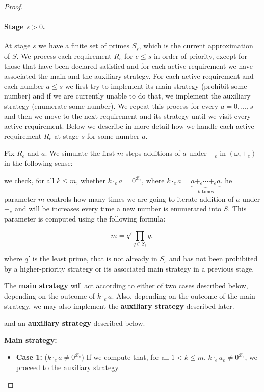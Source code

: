 \documentclass{pracalicmgr2025}
\theoremstyle{plain}            %
\theoremstyle{remark}           %
\theoremstyle{definition}       %
\begin{document}
\begin{proof}
\paragraph{Stage $s > 0$.}
At stage $s$ we have a finite set of primes $S_s$, which is the current approximation of $S$. We process each requirement $R_e$ for $e \le s$ in order of priority, except for those that have been declared satisfied and for each active requirement we have associated the main and the auxiliary strategy. For each active requirement and each number $a \le s$ we first try to implement its main strategy (prohibit some number) and if we are currently unable to do that, we implement the auxiliary strategy (enumerate some number). We repeat this process for every $a=0,...,s$ and then we move to the next requirement and its strategy until we visit every active requirement. Below we describe in more detail how we handle each active requirement $R_e$ at stage $s$ for some number $a$.


  
Fix $R_e$ and $a$. We simulate the first $m$ steps additions of $a$ under $+_e$ in $(\omega, +_e)$ in the following sense: 

we check, for all $k \le m$, whether $k \cdot_e a = 0^{\mathcal{B}_e}$, where $k \cdot_e a = \underbrace{a +_e \cdots +_e a}_{k \text{ times}}$. he parameter $m$ controls how many times we are going to iterate addition of $a$ under $+_e$ and will be increases every time a new number is enumerated into $S$. This parameter is computed using the following formula:

$$m = q' \prod_{q \in S_s} q,$$

where $q'$ is the least prime, that is not already in $S_s$ and has not been prohibited by a higher-priority strategy or its associated main strategy in a previous stage.


The \textbf{ main strategy} will act according to either of two cases described below, depending on the outcome of $k \cdot_e a$. Also, depending on the outcome of the main strategy, we may also implement the \textbf{auxiliary strategy} described later.

and an \textbf{auxiliary strategy} described below.

\textbf{Main strategy:}
\begin{itemize}
    \item \textbf{Case 1:} ($k \cdot_e a \neq 0^{\mathcal{B}_e}$)  
        If we compute that, for all $1< k \le m$, $k \cdot_e a_e \neq 0^{\mathcal{B}_e}$, we   proceed to the auxiliary strategy.


\end{itemize}
\end{proof}
\end{document}
